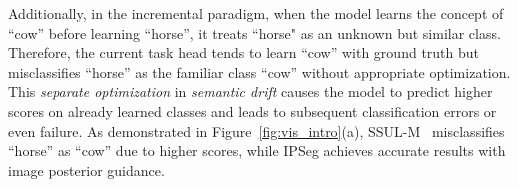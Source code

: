 
Additionally, in the incremental paradigm, when the model learns the concept of ``cow'' before learning ``horse'',  it treats ``horse" as an unknown but similar class. Therefore, the current task head tends to learn ``cow'' with ground truth but misclassifies ``horse'' as the familiar class ``cow'' without appropriate optimization. This \textit{separate optimization} in \textit{semantic drift} causes the model to predict higher scores on already learned classes and leads to subsequent classification errors or even failure. As demonstrated in Figure~\ref{fig:vis_intro}(a), SSUL-M~\citep{SSUL_cha2021ssul} misclassifies ``horse'' as ``cow'' due to higher scores, while IPSeg achieves accurate results with image posterior guidance. 
\fi




